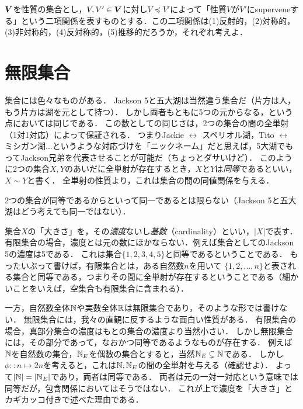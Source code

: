 \documentclass[11pt,a4paper]{jsarticle} %
\begin{document}
\begin{exercise}
 $\boldsymbol{V}$を性質の集合とし，$V, V' \in \boldsymbol{V}$に対し$V \preceq V'$によって「性質$V$が$V'$にsuperveneする」という二項関係を表すものとする．この二項関係は(1)反射的，(2)対称的，(3)非対称的，(4)反対称的，(5)推移的だろうか，それぞれ考えよ．
\end{exercise}


\section{無限集合}
集合には色々なものがある．
Jackson 5と五大湖は当然違う集合だ（片方は人，もう片方は湖を元として持つ）．
しかし両者もともに5つの元からなる，という点においては同じである．
この数としての同じさは，2つの集合の間の全単射（1対1対応）によって保証される．
つまりJackie $\leftrightarrow$ スペリオル湖，Tito $\leftrightarrow$ ミシガン湖$\dots$というような対応づけを「ニックネーム」だと思えば，5大湖でもってJackson兄弟を代表させることが可能だ（ちょっとダサいけど）．
このように2つの集合$X, Y$のあいだに全単射が存在するとき，$X$と$Y$は\emph{同等}であるといい，$X \sim Y$と書く．
全単射の性質より，これは集合の間の同値関係を与える．

\begin{attn}
 2つの集合が同等であるからといって同一であるとは限らない（Jackson 5と五大湖はどう考えても同一ではない）．
\end{attn}

集合$X$の「大きさ」を，その\emph{濃度}ないし\emph{基数}（cardinality）といい，$|X|$で表す．
有限集合の場合，濃度とは元の数にほかならない．例えば集合としてのJackson 5の濃度は5である．
これは集合$\{1, 2, 3, 4, 5\}$と同等であるということである．
もったいぶって書けば，有限集合とは，ある自然数$n$を用いて $\{1, 2, \dots, n\}$と表される集合と同等である，つまりその間に全単射が存在するということである（細かいことをいえば，空集合も有限集合に含まれる）．

一方，自然数全体$\mathbb{N}$や実数全体$\mathbb{R}$は無限集合であり，そのような形では書けない．
無限集合には，我々の直観に反するような面白い性質がある．
有限集合の場合，真部分集合の濃度はもとの集合の濃度より当然小さい．
しかし無限集合には，その部分であって，なおかつ同等であるようなものが存在する．
例えば$\mathbb{N}$を自然数の集合，$\mathbb{N}_E$を偶数の集合とすると，当然$\mathbb{N}_E \subsetneq \mathbb{N}$である．
しかし$\phi::n \mapsto 2n$を考えると，これは$\mathbb{N}, \mathbb{N}_E$の間の全単射を与える（確認せよ）．
よって$|\mathbb{N}| = |\mathbb{N}_E|$であり，両者は同等である．
両者は元の一対一対応という意味では同等だが，包含関係においてはそうではない．
これが上で濃度を「大きさ」とカギカッコ付きで述べた理由である．
\end{document}
